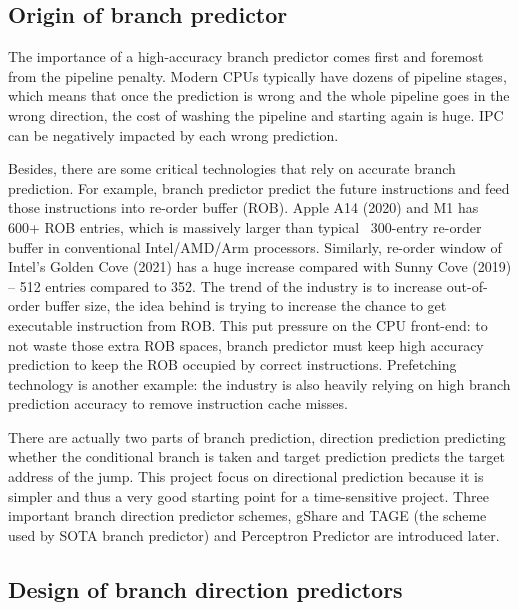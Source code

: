 \subsection{Origin of branch predictor} %
The importance of a high-accuracy branch predictor comes first and foremost from the pipeline penalty. 
Modern CPUs typically have dozens of pipeline stages, which means that once the prediction is wrong 
and the whole pipeline goes in the wrong direction, the cost of washing the pipeline and starting again 
is huge. IPC can be negatively impacted by each wrong prediction.
\par\hspace*{\fill}\par
Besides, there are some critical technologies that rely on accurate branch prediction. For example, 
branch predictor predict the future instructions and feed those instructions into re-order buffer (ROB). 
Apple A14 (2020) and M1 has 600+ ROB entries\cite{frumusanu_apple_2022}, which is massively larger than typical ~300-entry 
re-order buffer in conventional Intel/AMD/Arm processors. Similarly, re-order window of Intel's
Golden Cove (2021) has a huge increase compared with Sunny Cove (2019) – 512 entries compared to 
352\cite{frumusanu_intel_2021}. The trend of the industry is to increase out-of-order buffer size, the idea behind is trying to increase the chance to get executable instruction from ROB. This put pressure on the CPU front-end: to not 
waste those extra ROB spaces, branch predictor must keep high accuracy prediction to keep the ROB 
occupied by correct instructions. Prefetching technology is another example: the industry is also 
heavily relying on high branch prediction accuracy to remove instruction cache misses\cite{ishii_rebasing_2020}.
\par\hspace*{\fill}\par

There are actually two parts of branch prediction, direction prediction predicting whether the 
conditional branch is taken and target prediction predicts the target address of the jump. This project 
focus on directional prediction because it is simpler and thus a very good starting point for a time-sensitive project. Three important branch direction predictor schemes, gShare\cite{mcfarling_combining_1993} and TAGE\cite{seznec_case_2006} (the scheme used by SOTA branch predictor) and Perceptron Predictor\cite{jimenez_dynamic_2001} are introduced later. 


\subsection{Design of branch direction predictors}
